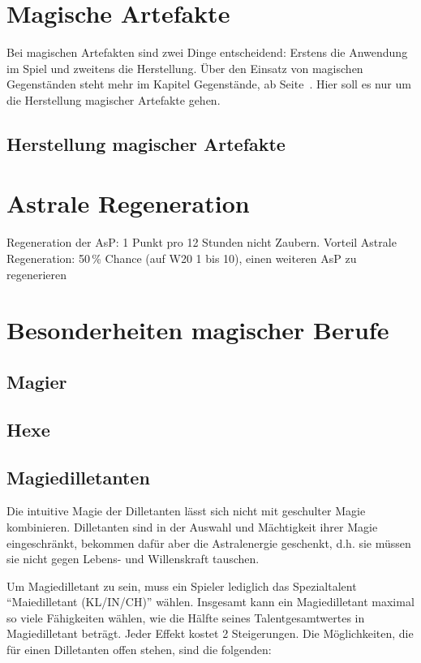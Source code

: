 \BN
\section{Magische Artefakte}
Bei magischen Artefakten sind zwei Dinge entscheidend: Erstens die Anwendung im Spiel und zweitens die Herstellung. Über den Einsatz von magischen Gegenständen steht mehr im Kapitel Gegenstände, ab Seite~\pageref{Ch:Gegenstaende}. Hier soll es nur um die Herstellung magischer Artefakte gehen.

\subsection{Herstellung magischer Artefakte}
\EN

\section{Astrale Regeneration}
Regeneration der AsP: 1 Punkt pro 12 Stunden nicht Zaubern. Vorteil Astrale Regeneration: 50\,\% Chance (auf W20 1 bis 10), einen weiteren AsP zu regenerieren
\section{Besonderheiten magischer Berufe}

\BN
\subsection{Magier}
\EN

\BN
\subsection{Hexe}
\EN

\subsection{Magiedilletanten}
\BN
Die intuitive Magie der Dilletanten lässt sich nicht mit geschulter Magie kombinieren. Dilletanten sind in der Auswahl und Mächtigkeit ihrer Magie eingeschränkt, bekommen dafür aber die Astralenergie geschenkt, d.h. sie müssen sie nicht gegen Lebens- und Willenskraft tauschen.

Um Magiedilletant zu sein, muss ein Spieler lediglich das Spezialtalent ``Maiedilletant (KL/IN/CH)'' wählen. Insgesamt kann ein Magiedilletant maximal so viele Fähigkeiten wählen, wie die Hälfte seines Talentgesamtwertes in Magiedilletant beträgt. Jeder Effekt kostet 2 Steigerungen. Die Möglichkeiten, die für einen Dilletanten offen stehen, sind die folgenden:

